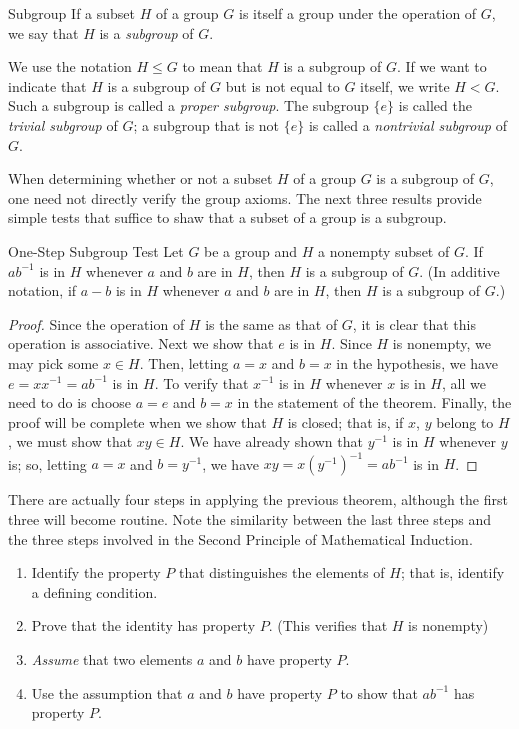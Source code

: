\documentclass[../butidigress.tex]{subfiles}
\begin{document}
\begin{definition}{Subgroup}
If a subset $H$ of a group $G$ is itself a group under the operation of $G$, we say that $H$ is a \emph{subgroup} of $G$.
\end{definition}

We use the notation $H \leq G$ to mean that $H$ is a subgroup of $G$.
If we want to indicate that $H$ is a subgroup of $G$ but is not equal to $G$ itself, we write $H < G$.
Such a subgroup is called a \emph{proper subgroup}.
The subgroup $\{e\}$ is called the \emph{trivial subgroup} of $G$; a subgroup that is not $\{e\}$ is called a \emph{nontrivial subgroup} of $G$.

When determining whether or not a subset $H$ of a group $G$ is a subgroup of $G$, one need not directly verify the group axioms.
The next three results provide simple tests that suffice to shaw that a subset of a group is a subgroup.

\begin{theorem}{One-Step Subgroup Test}
Let $G$ be a group and $H$ a nonempty subset of $G$.
If $ab^{-1}$ is in $H$ whenever $a$ and $b$ are in $H$, then $H$ is a subgroup of $G$.
(In additive notation, if $a - b$ is in $H$ whenever $a$ and $b$ are in $H$, then $H$ is a subgroup of $G$.)
\end{theorem}

\begin{proof}
Since the operation of $H$ is the same as that of $G$, it is clear that this operation is associative.
Next we show that $e$ is in $H$.
Since $H$ is nonempty, we may pick some $x \in H$.
Then, letting $a = x$ and $b = x$ in the hypothesis, we have $e = xx^{-1} = ab^{-1}$ is in $H$.
To verify that $x^{-1}$ is in $H$ whenever $x$ is in $H$, all we need to do is choose $a = e$ and $b = x$ in the statement of the theorem.
Finally, the proof will be complete when we show that $H$ is closed; that is, if $x$, $y$ belong to $H$, we must show that $xy \in H$.
We have already shown that $y^{-1}$ is in $H$ whenever $y$ is; so, letting $a = x$ and $b = y^{-1}$, we have $xy = x(y^{-1})^{-1} = ab^{-1}$ is in $H$.
\end{proof}

There are actually four steps in applying the previous theorem, although the first three will become routine.
Note the similarity between the last three steps and the three steps involved in the Second Principle of Mathematical Induction.
\begin{enumerate}\mathlist
    \item Identify the property $P$ that distinguishes the elements of $H$; that is, identify a defining condition.
    \item Prove that the identity has property $P$. (This verifies that $H$ is nonempty)
    \item \emph{Assume} that two elements $a$ and $b$ have property $P$.
    \item Use the assumption that $a$ and $b$ have property $P$ to show that $ab^{-1}$ has property $P$.
\end{enumerate}
\end{document}
